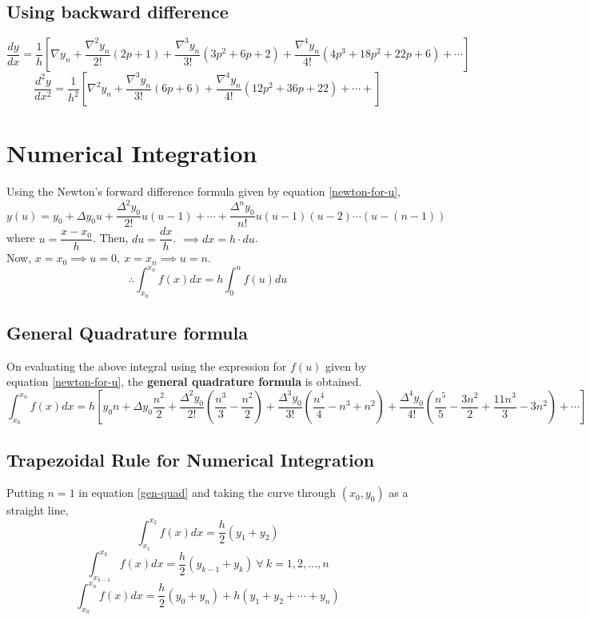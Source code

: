 \documentclass[12pt,a4paper,landscape]{article}
\begin{document}
	\subsection{Using backward difference}
	\begin{dmath}\label{newton-back-diff}
		\boxed{\dfrac{dy}{dx} = \dfrac{1}{h} \left[ \nabla y_n + \dfrac{\nabla^2 y_n}{2!} (2p+1) + \dfrac{\nabla^3 y_n}{3!} (3p^2+6p+2) + \dfrac{\nabla^4 y_n}{4!} (4p^3 + 18p^2 + 22p + 6) + \cdots\right]}
	\end{dmath}
	\begin{dmath}\label{newton-back-diff2}
		\boxed{\dfrac{d^2y}{dx^2} = \dfrac{1}{h^2} \left[ \nabla^2 y_n + \dfrac{\nabla^3 y_n}{3!} (6p+6) + \dfrac{\nabla^4 y_n}{4!} (12p^2 + 36p + 22) + \cdots + \right]}
	\end{dmath}
	
	\section{Numerical Integration}
	Using the Newton's forward difference formula given by equation \ref{newton-for-u},
	\[y(u) = y_0 + \Delta y_0u + \dfrac{\Delta^2 y_0}{2!} u(u-1) + \cdots + \dfrac{\Delta^n y_0}{n!} u(u-1)(u-2)\cdots (u-(n-1))\]
	where $u = \dfrac{x-x_0}{h}$. Then, $du = \dfrac{dx}{h}$.
	$\implies dx = h\cdot du$.\\
	Now, $x=x_0\implies u=0,\ x=x_n\implies u = n$.
	\[\therefore \int_{x_0}^{x_n} f(x)dx = h\int_{0}^{n} f(u) du \]
	\subsection{General Quadrature formula}
	On evaluating the above integral using the expression for $f(u)$ given by equation \ref{newton-for-u}, the \textbf{general quadrature formula} is obtained.
	\begin{equation}\label{gen-quad}
		\int_{x_0}^{x_n} f(x)dx = h \left[y_0 n + \Delta y_0 \dfrac{n^2}{2} + \dfrac{\Delta^2 y_0}{2!}\left( \dfrac{n^3}{3} - \dfrac{n^2}{2}\right) + \dfrac{\Delta^3 y_0}{3!}\left( \dfrac{n^4}{4} - n^3 + n^2\right) + \dfrac{\Delta^4 y_0}{4!}\left( \dfrac{n^5}{5} - \dfrac{3n^2}{2} + \dfrac{11n^3}{3} - 3n^2\right) + \cdots\right]
	\end{equation}
	\subsection{Trapezoidal Rule for Numerical Integration}
	Putting $n=1$ in equation \ref{gen-quad} and taking the curve through $(x_0,y_0)$ as a straight line,
	\[ \int_{x_1}^{x_2} f(x)dx = \dfrac{h}{2}\left(y_1 + y_2\right) \]
	\[ \int_{x_{k-1}}^{x_k} f(x)dx = \dfrac{h}{2}\left(y_{k-1} + y_k\right)\ \forall\ k=1,2,\ldots,n\]
	\begin{equation}
		\boxed{\int_{x_0}^{x_n}f(x)dx = \dfrac{h}{2}\left(y_0 + y_n\right) + h \left(y_1 + y_2 + \cdots + y_n\right)}
	\end{equation}
\end{document}
